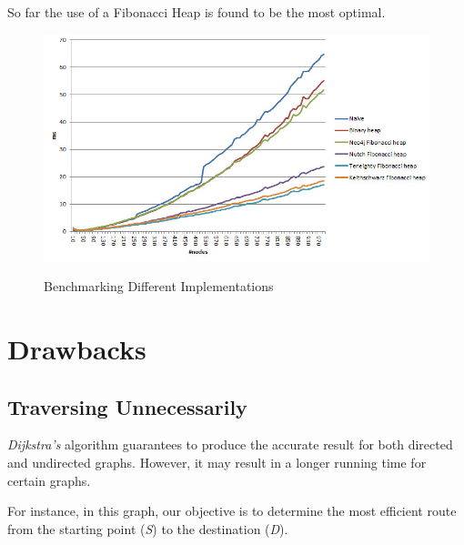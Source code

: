 \documentclass[12pt, a4paper]{article}
\begin{document}
So far the use of a Fibonacci Heap is found to be the most optimal.
\begin{figure}[h]
    \centering
    \includegraphics[width=\textwidth]{benchmark.jpg}
    \caption{Benchmarking Different Implementations}
    \cite{baeldung_2022}
\end{figure}



\clearpage

\section{Drawbacks}
\subsection{Traversing Unnecessarily}

 \textit{Dijkstra's} algorithm guarantees to produce the accurate result for both directed and undirected graphs. However, it may result in a longer running time for certain graphs.

\par For instance, in this graph, our objective is to determine the most efficient route from the starting point (\textit{S}) to the destination (\textit{D}). 

\vspace{1cm}
\end{document}
